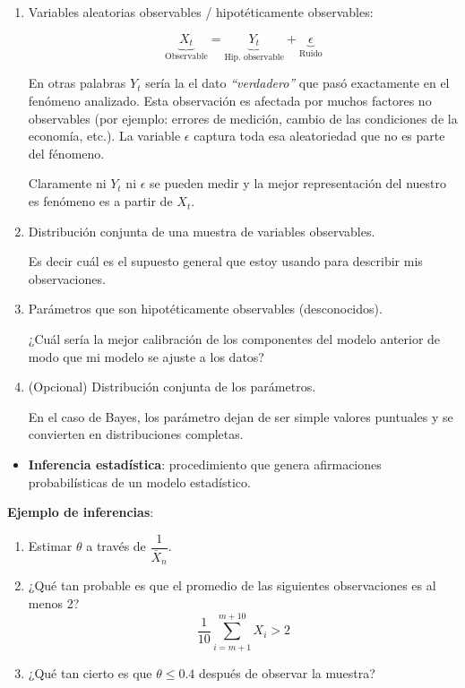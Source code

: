 \documentclass[
  12pt,
]{book}
\providecommand{\tightlist}{%
  \setlength{\itemsep}{0pt}\setlength{\parskip}{0pt}}
\begin{document}
\begin{enumerate}
\def\labelenumi{\arabic{enumi}.}
\item
  Variables aleatorias observables / hipotéticamente observables:

  \begin{equation*}
    \underbrace{X_t}_{\text{Observable}} = \underbrace{Y_t}_{\text{Hip. observable}} + \underbrace{\epsilon}_{\text{Ruido}}
    \end{equation*}

  En otras palabras \(Y_t\) sería la el dato \emph{``verdadero''} que pasó
  exactamente en el fenómeno analizado. Esta observación es afectada por
  muchos factores no observables (por ejemplo: errores de medición, cambio
  de las condiciones de la economía, etc.). La variable \(\epsilon\) captura
  toda esa aleatoriedad que no es parte del fénomeno.

  Claramente ni \(Y_t\) ni \(\epsilon\) se pueden medir y la mejor
  representación del nuestro es fenómeno es a partir de \(X_t\).
\item
  Distribución conjunta de una muestra de variables observables.

  Es decir cuál es el supuesto general que estoy usando para describir mis
  observaciones.
\item
  Parámetros que son hipotéticamente observables (desconocidos).

  ¿Cuál sería la mejor calibración de los componentes del modelo anterior de
  modo que mi modelo se ajuste a los datos?
\item
  (Opcional) Distribución conjunta de los parámetros.

  En el caso de Bayes, los parámetro dejan de ser simple valores puntuales y se
  convierten en distribuciones completas.
\end{enumerate}

\begin{itemize}
\tightlist
\item
  \textbf{Inferencia estadística}: procedimiento que genera afirmaciones probabilísticas de un modelo estadístico.
\end{itemize}

\textbf{Ejemplo de inferencias}:

\begin{enumerate}
\def\labelenumi{\arabic{enumi}.}
\item
  Estimar \(\theta\) a través de \(\dfrac{1}{\bar X_n}\).
\item
  ¿Qué tan probable es que el promedio de las siguientes observaciones es al menos 2?
  \begin{equation*}
  \dfrac{1}{10}\sum_{i= m+1}^{m+10} X_i > 2
  \end{equation*}
\item
  ¿Qué tan cierto es que \(\theta\leq0.4\) después de observar la muestra?
\end{enumerate}
\end{document}
